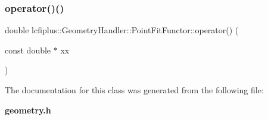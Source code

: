 \subsubsection{operator()()}
{\footnotesize\ttfamily double lcfiplus\+::\+Geometry\+Handler\+::\+Point\+Fit\+Functor\+::operator() (\begin{DoxyParamCaption}\item[{const double $\ast$}]{xx }\end{DoxyParamCaption})\hspace{0.3cm}{\ttfamily [inline]}}



The documentation for this class was generated from the following file\+:\begin{DoxyCompactItemize}
\item 
\textbf{ geometry.\+h}\end{DoxyCompactItemize}
